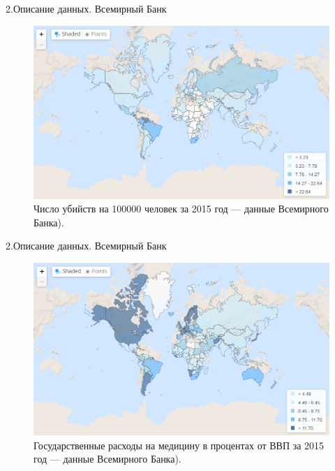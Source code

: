 \documentclass[aspectratio=169]{beamer}
\begin{document}
\begin{frame}{2.Описание данных. Всемирный Банк}
\begin{figure} \label{hompic}
            \centering
            \includegraphics[scale=0.3]{homicides.png}
            \caption{Число убийств на 100000 человек за 2015 год --- данные Всемирного Банка).}
            
        \end{figure}
\end{frame}

\begin{frame}{2.Описание данных. Всемирный Банк}
\begin{figure} \label{hompic}
            \centering
            \includegraphics[scale=0.3]{medicine.png}
            \caption{Государственные расходы на медицину в процентах от ВВП  за 2015 год --- данные Всемирного Банка).}
            
        \end{figure}
\end{frame}
\end{document}
